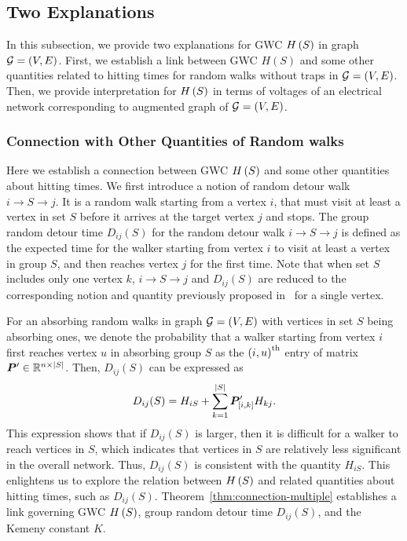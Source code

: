 \documentclass[10pt,twocolumn,twoside]{IEEEtran}
\begin{document}
\subsection{Two Explanations }

In this subsection, we provide two explanations for GWC \(H\left(S\right)\) in graph \(\mathcal{G}=(V,E)\). First, we establish a link between GWC $H(S)$ and some other quantities related to hitting times for  random walks without traps in \(\mathcal{G}=(V,E)\). Then, we provide interpretation for  \(H\left(S\right)\)  in terms of voltages of an electrical network corresponding to augmented graph of \(\mathcal{G}=(V,E)\).

\subsubsection{Connection with Other Quantities of Random walks}


Here we establish a connection between GWC \(H\left(S\right)\) and some other quantities about hitting times.  We first introduce a notion of random detour walk $i\rightarrow S \rightarrow j$. It is a random walk starting from a vertex $i$, that must visit at least a vertex in set $S$ before it arrives at the target vertex $j$ and stops. The group random detour time  \(D_{ij}(S)\) for the random detour walk $i\rightarrow S \rightarrow j$ is defined as the expected time for the walker starting from vertex \(i\) to visit at least a vertex in group \(S\), and then reaches vertex \(j\) for the first time. Note that when set $S$ includes only one vertex $k$, $i\rightarrow S \rightarrow j$ and \(D_{ij}(S)\) are reduced to the corresponding notion and quantity previously proposed in~\cite{RaZh13,BoRaZh11} for a single vertex.


For an absorbing random walks in graph \(\mathcal{G}=(V,E)\)  with vertices in set \(S\)  being absorbing ones,  we denote the probability that a walker starting from vertex \(i\) first reaches vertex \(u\) in absorbing group \(S\) as the \({(i,u)}^{\rm{th}}\) entry of matrix \(\boldsymbol{P}'\in\mathbb{R}^{n\times\left|S \right|}\). Then, \(D_{ij}(S)\) can be expressed as
\begin{equation}
    D_{ij}(S)= H_{iS}+\sum_{k=1}^{\left|S \right|}\boldsymbol{P}'_{[i,k]}H_{kj}.
\end{equation}
This expression shows that  if \(D_{ij}(S)\) is larger, then it is difficult for a walker to reach vertices in \(S\), which indicates that vertices in \(S\) are relatively less significant in the overall network. Thus, \(D_{ij}(S)\) is consistent with the quantity $H_{iS}$. This enlightens us to explore the relation between \(H\left(S\right)\) and related quantities about hitting times, such as  \(D_{ij}(S)\). Theorem~\ref{thm:connection-multiple} establishes a link governing GWC \(H\left(S\right)\), group random detour time \(D_{ij}(S)\), and the Kemeny constant \(K\).
\end{document}
